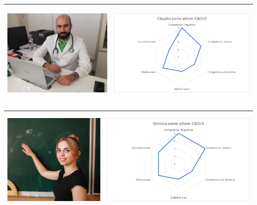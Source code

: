 \documentclass[../Report.tex]{subfiles}
\begin{document}
    \begin{table}[H]
        \begin{tabular}{|c|c|}
            \hline
            \includegraphics[height=5cm]{Claudio.jpg} & \includegraphics[height=5cm]{ClaudioCAOS.png} \\
            \hline
        \end{tabular}
    \end{table}

    \begin{table}[H]
        \begin{tabular}{|c|c|}
            \hline
            \includegraphics[height=5cm]{Simona.jpg} & \includegraphics[height=5cm]{SimonaCAOS.png} \\
            \hline
        \end{tabular}
    \end{table}
\end{document}
